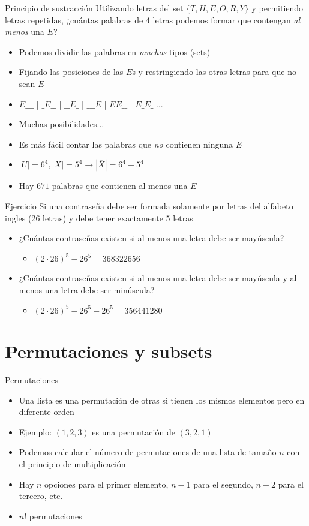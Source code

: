 \documentclass[10pt]{beamer}
\newcommand{\bi}{\begin{itemize}}
\newcommand{\ei}{\end{itemize}}
\begin{document}
\begin{frame}{Principio de sustracción}
  Utilizando letras del set $\{T, H, E, O, R, Y\}$ y permitiendo letras repetidas, 
  ¿cuántas palabras de 4 letras podemos formar que contengan \textit{al menos} una $E$?

  \bi
    \item<2-> Podemos dividir las palabras en \textit{muchos} tipos (sets)
    \item<2-> Fijando las posiciones de las $E$s y restringiendo las otras letras para que no sean $E$
    \item<2-> $E\_\_\_$ | $\_E\_\_$ | $\_\_E\_$ | $\_\_\_E$ | $EE\_\_$ | $E\_E\_$ ...
    \item<3-> Muchas posibilidades...
    \item<4-> Es más fácil contar las palabras que \textit{no} contienen ninguna $E$
    \item<4-> $|U| = 6^4, |X| = 5^4 \rightarrow |\overline{X}| = 6^4 - 5^4$
    \item<4-> Hay $671$ palabras que contienen al menos una $E$
  \ei
\end{frame}

\begin{frame}{Ejercicio}
  Si una contraseña debe ser formada solamente por letras del alfabeto ingles (26 letras) 
  y debe tener exactamente 5 letras

  \bi
    \item ¿Cuántas contraseñas existen si al menos una letra debe ser mayúscula?
    \bi
      \item<2-> $(2 \cdot 26)^5 - 26^5 = 368322656$
    \ei
    \item ¿Cuántas contraseñas existen si al menos una letra debe ser mayúscula y al menos una letra debe ser minúscula?
    \bi
      \item<3-> $(2 \cdot 26)^5 - 26^5 - 26^5 = 356441280$
    \ei
  \ei
\end{frame}

\section{Permutaciones y subsets}

\begin{frame}{Permutaciones}
  \bi
    \item Una lista es una permutación de otras si tienen los mismos elementos pero en diferente orden
    \item Ejemplo: $(1, 2, 3)$ es una permutación de $(3, 2, 1)$
    \item<2-> Podemos calcular el número de permutaciones de una lista de tamaño $n$ con el principio de multiplicación
    \item<2-> Hay $n$ opciones para el primer elemento, $n - 1$ para el segundo, $n - 2$ para el tercero, etc.
    \item<3-> $n!$ permutaciones
  \ei
\end{frame}
\end{document}
